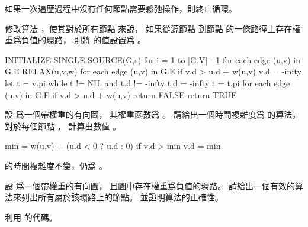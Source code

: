 \startANSWER
如果一次遍歷過程中沒有任何節點需要鬆弛操作，則終止循環。
\stopANSWER

\startEXERCISE[exercise:24.1-4]
修改算法 ，使其對於所有節點  來說，
如果從源節點  到節點  的一條路徑上存在權重爲負值的環路，
則將  的值設置爲 \m{-\infty}。
\stopEXERCISE

\startANSWER
{}
\startCLRS
INITIALIZE-SINGLE-SOURCE(G,s)
for i = 1 to |G.V| - 1
	for each edge (u,v) in G.E
		RELAX(u,v,w)
for each edge (u,v) in G.E
	if v.d > u.d + w(u,v)
		v.d = -infty
		let t = v.pi
		while t != NIL and t.d != -infty
			t.d = -infty
			t = t.pi
for each edge (u,v) in G.E
	if v.d > u.d + w(u,v)
		return FALSE
return TRUE
\stopCLRS
\stopANSWER

\startEXERCISE\DIFFICULT
設  爲一個帶權重的有向圖，
其權重函數爲 。
請給出一個時間複雜度爲  的算法，
對於每個節點 ，
計算出數值 。
\stopEXERCISE

\startANSWER
{}
\startCLRS
min = w(u,v) + (u.d < 0 ? u.d : 0)
if v.d > min
	v.d = min
\stopCLRS

 的時間複雜度不變，仍爲 。
\stopANSWER

\startEXERCISE\DIFFICULT
設  爲一個帶權重的有向圖，
且圖中存在權重爲負值的環路。
請給出一個有效的算法來列出所有屬於該環路上的節點。
並證明算法的正確性。
\stopEXERCISE

\startANSWER
利用 的代碼。
\stopANSWER

\stopsection
